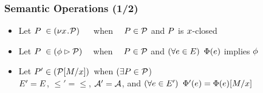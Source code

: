 \documentclass[t,aspectratio=169]{beamer} %
\begin{document}
\begin{frame}
  \frametitle{Semantic Operations (1/2)}
  \begin{itemize}[<+->]
  \item
    Let $P\phantom{'}\in(\nu x\!\mathbin.\!\mathcal{P}) \mkern22mu$ when $\phantom{(\exists}P\in\mathcal{P}$
    and $P$ is $x$-closed
  \item 
    Let $P\phantom{'}\in(\phi \mathbin\rhd \mathcal{P})\mkern16mu$ when $\phantom{(\exists}P\in\mathcal{P}$ and 
    $(\forall e\in E)$ $\Phi(e)$ implies $\phi$
  \item 
    Let $P'\in(\mathcal{P}[M/x])\mkern2mu$ when
    $(\exists P\in\mathcal{P}$)\\\qquad $E' = E$, ${\le'} = {\le}$,
    $\mathcal{A}' = \mathcal{A}$, and
    $(\forall e\in E')$ $\Phi'(e) = \Phi(e)[M/x]$
    

\end{itemize}
\end{frame}
\end{document}
